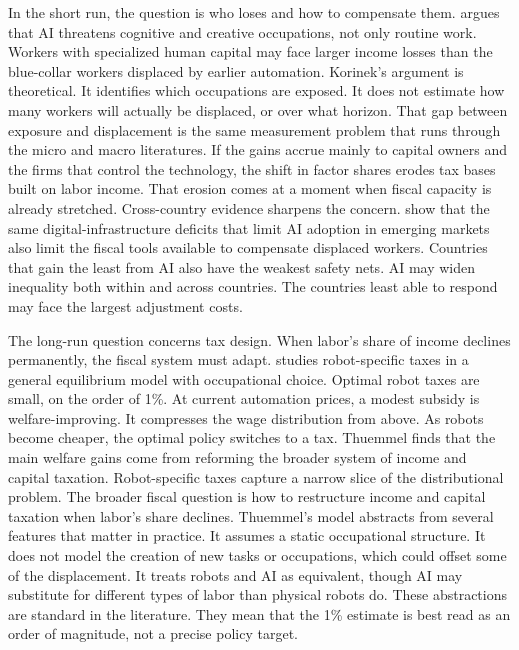 \documentclass[12pt]{article}
\begin{document}
In the short run, the question is who loses and how to compensate them. \citet{korinek2024policy} argues that AI threatens cognitive and creative occupations, not only routine work. Workers with specialized human capital may face larger income losses than the blue-collar workers displaced by earlier automation. Korinek's argument is theoretical. It identifies which occupations are exposed. It does not estimate how many workers will actually be displaced, or over what horizon. That gap between exposure and displacement is the same measurement problem that runs through the micro and macro literatures. If the gains accrue mainly to capital owners and the firms that control the technology, the shift in factor shares erodes tax bases built on labor income. That erosion comes at a moment when fiscal capacity is already stretched. Cross-country evidence sharpens the concern. \citet{gambacorta2026growth} show that the same digital-infrastructure deficits that limit AI adoption in emerging markets also limit the fiscal tools available to compensate displaced workers. Countries that gain the least from AI also have the weakest safety nets. AI may widen inequality both within and across countries. The countries least able to respond may face the largest adjustment costs.

The long-run question concerns tax design. When labor's share of income declines permanently, the fiscal system must adapt. \citet{thuemmel2023} studies robot-specific taxes in a general equilibrium model with occupational choice. Optimal robot taxes are small, on the order of 1\%. At current automation prices, a modest subsidy is welfare-improving. It compresses the wage distribution from above. As robots become cheaper, the optimal policy switches to a tax. Thuemmel finds that the main welfare gains come from reforming the broader system of income and capital taxation. Robot-specific taxes capture a narrow slice of the distributional problem. The broader fiscal question is how to restructure income and capital taxation when labor's share declines. Thuemmel's model abstracts from several features that matter in practice. It assumes a static occupational structure. It does not model the creation of new tasks or occupations, which could offset some of the displacement. It treats robots and AI as equivalent, though AI may substitute for different types of labor than physical robots do. These abstractions are standard in the literature. They mean that the 1\% estimate is best read as an order of magnitude, not a precise policy target.
\end{document}
